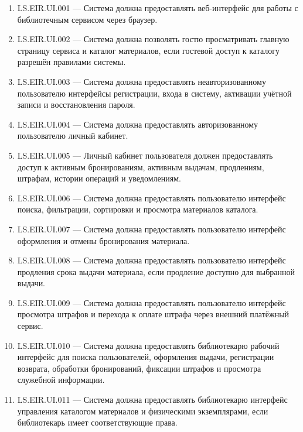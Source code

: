 \documentclass[12pt,a4paper]{article}
\begin{document}
	\begin{enumerate}
		\item LS.EIR.UI.001 --- Система должна предоставлять веб-интерфейс для работы
		с библиотечным сервисом через браузер.
		
		\item LS.EIR.UI.002 --- Система должна позволять гостю просматривать главную
		страницу сервиса и каталог материалов, если гостевой доступ к каталогу разрешён
		правилами системы.
		
		\item LS.EIR.UI.003 --- Система должна предоставлять неавторизованному
		пользователю интерфейсы регистрации, входа в систему, активации учётной записи
		и восстановления пароля.
		
		\item LS.EIR.UI.004 --- Система должна предоставлять авторизованному пользователю
		личный кабинет.
		
		\item LS.EIR.UI.005 --- Личный кабинет пользователя должен предоставлять доступ
		к активным бронированиям, активным выдачам, продлениям, штрафам, истории
		операций и уведомлениям.
		
		\item LS.EIR.UI.006 --- Система должна предоставлять пользователю интерфейс
		поиска, фильтрации, сортировки и просмотра материалов каталога.
		
		\item LS.EIR.UI.007 --- Система должна предоставлять пользователю интерфейс
		оформления и отмены бронирования материала.
		
		\item LS.EIR.UI.008 --- Система должна предоставлять пользователю интерфейс
		продления срока выдачи материала, если продление доступно для выбранной выдачи.
		
		\item LS.EIR.UI.009 --- Система должна предоставлять пользователю интерфейс
		просмотра штрафов и перехода к оплате штрафа через внешний платёжный сервис.
		
		\item LS.EIR.UI.010 --- Система должна предоставлять библиотекарю рабочий
		интерфейс для поиска пользователей, оформления выдачи, регистрации возврата,
		обработки бронирований, фиксации штрафов и просмотра служебной информации.
		
		\item LS.EIR.UI.011 --- Система должна предоставлять библиотекарю интерфейс
		управления каталогом материалов и физическими экземплярами, если библиотекарь
		имеет соответствующие права.
		

\end{enumerate}
\end{document}
